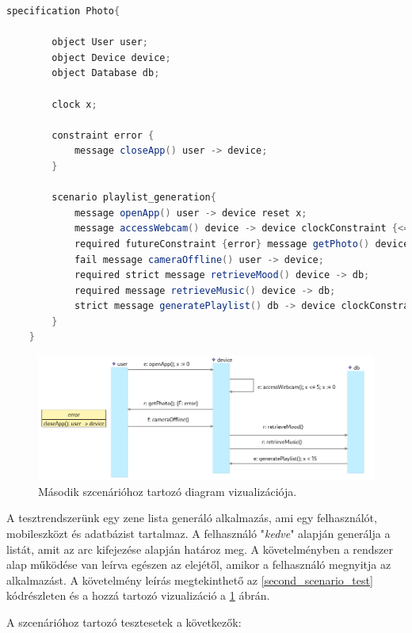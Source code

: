 \begin{lstlisting}[language=java, frame=single, float=ht!, caption={Második tesztesethez tartozó szcenárió.},captionpos=b,label=second_scenario_test]
    specification Photo{

        object User user;
        object Device device;
        object Database db;

        clock x;

        constraint error {
            message closeApp() user -> device;
        }

        scenario playlist_generation{
            message openApp() user -> device reset x;
            message accessWebcam() device -> device clockConstraint {<=(x, 5)} reset x;
            required futureConstraint {error} message getPhoto() device -> user;
            fail message cameraOffline() user -> device;
            required strict message retrieveMood() device -> db;
            required message retrieveMusic() device -> db;
            strict message generatePlaylist() db -> device clockConstraint {<(x, 15)};
        }
    }
\end{lstlisting}

\begin{figure}[!ht]
    \centering
    \includegraphics[width=160mm, keepaspectratio]{figures/diagramMobileExample.png}
    \caption{Második szcenárióhoz tartozó diagram vizualizációja.}
    \label{second_visualization}
\end{figure}

A tesztrendszerünk egy zene lista generáló alkalmazás, ami egy felhasználót, mobileszközt és adatbázist tartalmaz.
A felhasználó "\textit{kedve}" alapján generálja a listát, amit az arc kifejezése alapján határoz meg.
A követelményben a rendszer alap működése van leírva egészen az elejétől, amikor a felhasználó megnyitja az alkalmazást.
A követelmény leírás megtekinthető az \ref{second_scenario_test} kódrészleten és a hozzá tartozó vizualizáció a \ref{second_visualization} ábrán.

A szcenárióhoz tartozó tesztesetek a következők:

